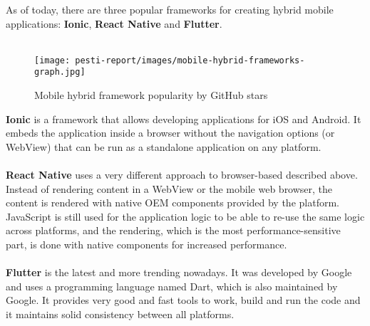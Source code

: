As of today, there are three popular frameworks for creating hybrid mobile applications: \textbf{Ionic}, \textbf{React Native} and \textbf{Flutter}.
\\ \\

\begin{figure}[H]
	\centering
	\texttt{[image: pesti-report/images/mobile-hybrid-frameworks-graph.jpg]}
	\caption{Mobile hybrid framework popularity by GitHub stars}
	\label{fig:mobile-hybrid-frameworks-graph}
\end{figure}


\textbf{Ionic} is a framework that allows developing applications for iOS and Android. It embeds the application inside a browser without the navigation options (or WebView) that can be run as a standalone application on any platform. \cite{IonicGitHub}
\\ \\
\textbf{React Native} uses a very different approach to browser-based described above. Instead of rendering content in a WebView or the mobile web browser, the content is rendered with native OEM components provided by the platform. JavaScript is still used for the application logic to be able to re-use the same logic across platforms, and the rendering, which is the most performance-sensitive part, is done with native components for increased performance. \cite{ReactNativeGitHub}
\\ \\
\textbf{Flutter} is the latest and more trending nowadays. It was developed by Google and uses a programming language named Dart, which is also maintained by Google. It provides very good and fast tools to work, build and run the code and it maintains solid consistency between all platforms. \cite{FlutterGitHub}